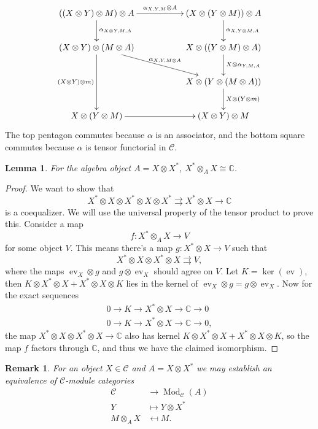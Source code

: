 \documentclass[11pt]{book}
\newtheorem{Lem}[theorem]{Lemma}
\theoremstyle{Rem}
\newtheorem{Rem}[theorem]{Remark}
\theoremstyle{definition}
\numberwithin{equation}{section}
\newcommand\ot{\otimes}
\newcommand\Mod{\operatorname{Mod}}
\newcommand\kk{\mathbb C}
\newcommand\C{\mathcal C}
\newcommand{\ra}\rightarrow
\newcommand\ev{\operatorname{ev}}
\begin{document}
\[
\xymatrix{((X\otimes Y ) \ot M)\ot A \ar[rr]^{\alpha_{X, Y, M} \ot A} \ar[d]^{\alpha_{X\ot Y, M , A}} & & (X\otimes(Y\ot M)) \ot A \ar[d]^{\alpha_{X, Y\ot M, A}}\\
(X\ot Y) \ot (M\ot A)\ar[dd]_{(X\ot Y)\ot m)} \ar[rrd]^{\alpha_{X, Y, M\ot A}}&  & X\ot ((Y \ot M) \ot A) \ar[d]^{X\ot \alpha_{Y, M, A}}\\
& & X\ot(Y\ot(M\ot A)) \ar[d]^{X\ot(Y\ot m)}\\
X\ot (Y\ot M) \ar[rr] & & (X\ot Y)\ot M
}
\]
The top pentagon commutes because $\alpha$ is an associator, and the bottom square commutes because $\alpha$ is tensor functorial in $\C$.
\begin{Lem}
For the algebra object $A=X\ot X^*$, $X^*\ot_A X\cong \kk$.
\end{Lem}
\begin{proof}
We want to show that \begin{equation}
	X^*\ot X \ot X^* \ot X \ot X^* \rightrightarrows X^*\ot X \ra \kk
\end{equation} is a coequalizer. We will use the universal property of the tensor product to prove this. Consider a map \begin{equation}
	f: X^* \ot_A X \ra V
\end{equation} for some object $V$. This means there's a map $g:X^*\ot X\ra V$ such that \begin{equation}
X^*\ot X \ot X^* \ot X 	\rightrightarrows V,
\end{equation} where the maps $\ev_X \ot g$ and $g \ot \ev_X$ should agree on $V$. Let $K=\ker (\ev)$, then $K\ot X^*\ot X + X^*\ot X \ot K$ lies in the kernel of $\ev_X\ot g = g\ot \ev_X$. Now for the exact sequences \begin{align*}
	0\ra K \ra X^*\ot X \ra \kk \ra 0\\
	0\ra K \ra X^*\ot X \ra \kk \ra 0,
\end{align*} the map $X^*\ot X \ot X^*\ot X \ra \kk$ also has kernel $K\ot X^*\ot X + X^*\ot X \ot K$, so the map $f$ factors through $\kk$, and thus we have the claimed isomorphism.
\end{proof}
\begin{Rem}\label{Cmoduleeqv}
For an object $X\in\C$ and $A=X\ot X^*$ we may establish an equivalence of $\C$-module categories \begin{align}
\C&\ra \Mod_\C(A)\\
Y&\mapsto Y\ot X^*\\
M\ot_A X&\mapsfrom M.
\end{align}
\end{Rem}
\end{document}
